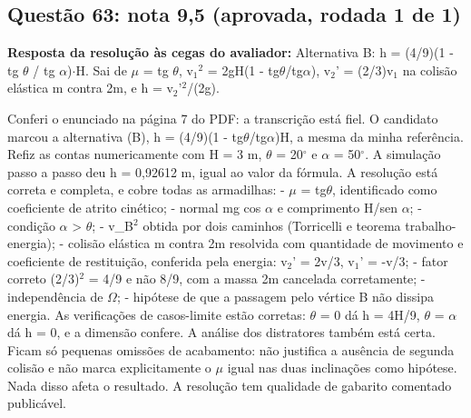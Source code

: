 \documentclass{article}%
\begin{document}
\subsection*{Questão 63: nota 9,5 (aprovada, rodada 1 de 1)}%
\textbf{Resposta da resolução às cegas do avaliador:} Alternativa B: h = (4/9)(1 - tg $\theta$ / tg $\alpha$)$\cdot$H. Sai de $\mu$ = tg $\theta$, v$_{1}$$^2$ = 2gH(1 - tg$\theta$/tg$\alpha$), v$_{2}$' = (2/3)v$_{1}$ na colisão elástica m contra 2m, e h = v$_{2}$'$^2$/(2g).\par %
Conferi o enunciado na página 7 do PDF: a transcrição está fiel. O candidato marcou a alternativa (B), h = (4/9)(1 - tg$\theta$/tg$\alpha$)H, a mesma da minha referência.\newline%
\newline%
Refiz as contas numericamente com H = 3 m, $\theta$ = 20$^\circ$ e $\alpha$ = 50$^\circ$. A simulação passo a passo deu h = 0,92612 m, igual ao valor da fórmula.\newline%
\newline%
A resolução está correta e completa, e cobre todas as armadilhas:\newline%
{-} $\mu$ = tg$\theta$, identificado como coeficiente de atrito cinético;\newline%
{-} normal mg cos $\alpha$ e comprimento H/sen $\alpha$;\newline%
{-} condição $\alpha$ > $\theta$;\newline%
{-} v\_B$^2$ obtida por dois caminhos (Torricelli e teorema trabalho{-}energia);\newline%
{-} colisão elástica m contra 2m resolvida com quantidade de movimento e coeficiente de restituição, conferida pela energia: v$_{2}$' = 2v/3, v$_{1}$' = -v/3;\newline%
{-} fator correto (2/3)$^2$ = 4/9 e não 8/9, com a massa 2m cancelada corretamente;\newline%
{-} independência de $\Omega$;\newline%
{-} hipótese de que a passagem pelo vértice B não dissipa energia.\newline%
\newline%
As verificações de casos{-}limite estão corretas: $\theta$ = 0 dá h = 4H/9, $\theta$ = $\alpha$ dá h = 0, e a dimensão confere. A análise dos distratores também está certa.\newline%
\newline%
Ficam só pequenas omissões de acabamento: não justifica a ausência de segunda colisão e não marca explicitamente o $\mu$ igual nas duas inclinações como hipótese. Nada disso afeta o resultado. A resolução tem qualidade de gabarito comentado publicável.%
$$
\end{document}
